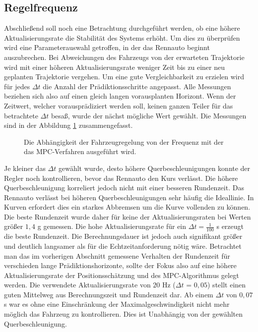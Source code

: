 \documentclass{like}
\begin{document}
\subsection{Regelfrequenz}
Abschließend soll noch eine Betrachtung durchgeführt werden, ob eine höhere Ak\-tu\-a\-li\-sie\-rungs\-ra\-te die Stabilität des Systems erhöht. Um dies zu überprüfen wird eine Parameter\-aus\-wahl getroffen, in der das Rennauto beginnt auszubrechen. Bei Abweichungen des Fahrzeugs von der erwarteten Trajektorie wird mit einer höheren Ak\-tu\-a\-li\-sie\-rungs\-ra\-te weniger Zeit bis zu einer neu geplanten Trajektorie vergehen. Um eine gute Vergleichbarkeit zu erzielen wird für jedes $\Delta t$ die Anzahl der Prädiktionsschritte angepasst. Alle Messungen beziehen sich also auf einen gleich langen vorausplanten Horizont. Wenn der Zeitwert, welcher vorausprädiziert werden soll, keinen ganzen Teiler für das betrachtete $\Delta t$ besaß, wurde der nächst mögliche Wert gewählt. Die Messungen sind in der Abbildung \ref{fig:measureUpdateRate} zusammengefasst. 
\begin{figure}[ht!]
	\centering
	\caption{Die Abhängigkeit der Fahrzeugregelung von der Frequenz mit der das \ac{MPC}-Verfahren ausgeführt wird. }\label{fig:measureUpdateRate}
\end{figure}
Je kleiner das $\Delta t$ gewählt wurde, desto höhere Querbeschleunigungen konnte der Regler noch kontrollieren, bevor das Rennauto den Kurs verlässt. Die höhere Querbeschleunigung korreliert jedoch nicht mit einer besseren Rundenzeit. Das Rennauto verlässt bei höheren Querbeschleunigungen sehr häufig die Ideallinie. In Kurven erfordert dies ein starkes Abbremsen um die Kurve vollenden zu können. Die beste Rundenzeit wurde daher für keine der Aktualisierungsraten bei Werten größer $1,4$ g gemessen. 
Die hohe Ak\-tu\-a\-li\-sie\-rungs\-ra\-te für ein $\Delta t = \frac{1}{100}$ s erzeugt die beste Rundenzeit. Die Berechnungsdauer ist jedoch auch signifikant größer und deutlich langsamer als für die Echtzeitanforderung nötig wäre. Betrachtet man das im vorherigen Abschnitt gemessene Verhalten der Rundenzeit für verschieden lange Prädiktionshorizonte, sollte der Fokus also auf eine höhere Ak\-tu\-a\-li\-sie\-rungs\-ra\-te der Positionsschätzung und des \ac{MPC}-Algorithmus gelegt werden. Die verwendete Ak\-tu\-a\-li\-sie\-rungs\-ra\-te von $20$ Hz ($\Delta t$ = $0,05$) stellt einen guten Mittelweg aus Berechnungszeit und Run\-den\-zeit dar. Ab einem $\Delta t$ von $0,07$ s war es ohne eine Einschränkung der Maximalgeschwindigkeit nicht mehr möglich das Fahrzeug zu kon\-t\-rol\-lie\-ren. Dies ist Unabhängig von der gewählten Quer\-be\-schleu\-ni\-gung. 
\end{document}
